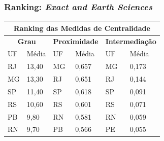 \subsubsection{Ranking: \textit{Exact and Earth Sciences}}

\begin{table}[H]
	\centering
	\begin{tabular}{|l|l|l|l|l|l|}
		\hline
		\multicolumn{6}{|c|}{\textbf{Ranking das Medidas de Centralidade}}                                                                                                                                             \\ \hline
		\multicolumn{2}{|c|}{\cellcolor[HTML]{C0C0C0}\textbf{Grau}} & \multicolumn{2}{c|}{\cellcolor[HTML]{C0C0C0}\textbf{Proximidade}} & \multicolumn{2}{c|}{\cellcolor[HTML]{C0C0C0}\textbf{Intermediação}}          \\ \hline
		UF                          & Média                         & UF                     & Média                                    & UF                                  & Média                                  \\ \hline
		RJ                          & 13,40                         & MG                     & 0,657                                    & MG                                  & 0,173                                  \\ \hline
		MG                          & 13,30                         & RJ                     & 0,651                                    & RJ                                  & 0,144                                  \\ \hline
		SP                          & 11,40                         & SP                     & 0,618                                    & SP                                  & 0,091                                  \\ \hline
		RS                          & 10,60                         & RS                     & 0,601                                    & RS                                  & 0,071                                  \\ \hline
		PB                          & 9,80                          & RN                     & 0,581                                    & RN                                  & 0,059                                  \\ \hline
		RN                          & 9,70                          & PB                     & 0,566                                    & PE                                  & 0,055                                  \\ \hline

\end{tabular}
\end{table}
